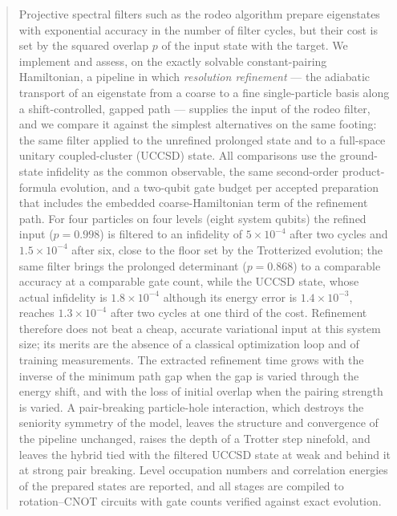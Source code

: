 \documentclass[
  aps,            %
  prc,            %
  reprint,        %
  superscriptaddress,
  floatfix,
  nofootinbib
]{revtex4-2}
\begin{document}
\begin{abstract}
Projective spectral filters such as the rodeo algorithm prepare eigenstates with
exponential accuracy in the number of filter cycles, but their cost is set by
the squared overlap $p$ of the input state with the target.  We implement and
assess, on the exactly solvable constant-pairing Hamiltonian, a pipeline in
which \emph{resolution refinement} --- the adiabatic transport of an eigenstate
from a coarse to a fine single-particle basis along a shift-controlled,
gapped path --- supplies the input of the rodeo filter, and we compare it
against the simplest alternatives on the same footing: the same filter applied
to the unrefined prolonged state and to a full-space unitary coupled-cluster
(UCCSD) state.  All comparisons use the ground-state infidelity as the common
observable, the same second-order product-formula evolution, and a two-qubit
gate budget per accepted preparation that includes the embedded
coarse-Hamiltonian term of the refinement path.  For four particles on four
levels (eight system qubits) the refined input ($p=0.998$) is filtered to an
infidelity of $5\times10^{-4}$ after two cycles and $1.5\times10^{-4}$ after
six, close to the floor set by the Trotterized evolution; the same filter brings
the prolonged determinant ($p=0.868$) to a comparable accuracy at a comparable
gate count, while the UCCSD state, whose actual infidelity is $1.8\times10^{-4}$
although its energy error is $1.4\times10^{-3}$, reaches $1.3\times10^{-4}$
after two cycles at one third of the cost.  Refinement therefore does not
beat a cheap, accurate variational input at this system size; its merits are
the absence of a classical optimization loop and of training measurements.
The extracted refinement time grows with the inverse of the minimum path gap
when the gap is varied through the energy shift, and with the loss of initial
overlap when the pairing strength is varied.  A pair-breaking particle-hole
interaction, which destroys the seniority symmetry of the model, leaves the
structure and convergence of the pipeline unchanged, raises the depth of a
Trotter step ninefold, and leaves the hybrid tied with the filtered UCCSD state
at weak and behind it at strong pair breaking.  Level occupation numbers and
correlation energies of the prepared states are reported, and all stages are
compiled to rotation--CNOT circuits with gate counts verified against exact
evolution.
\end{abstract}

\maketitle
\end{document}
